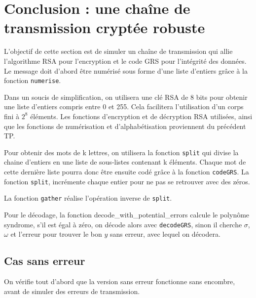 \documentclass[titlepage]{article}
\begin{document}
    \section{Conclusion : une chaîne de transmission cryptée robuste}
    L'objectif de cette section est de simuler un chaîne de transmission qui allie l'algorithme RSA pour l'encryption et le code GRS pour l'intégrité des données.
    Le message doit d'abord être numérisé sous forme d'une liste d'entiers grâce à la fonction \texttt{numerise}.
    
    Dans un soucis de simplification, on utilisera une clé RSA de 8 bits pour obtenir une liste d'entiers compris entre 0 et 255. Cela facilitera l'utilisation d'un corps fini à $2^8$ éléments.
    Les fonctions d'encryption et de décryption RSA utilisées, ainsi que les fonctions de numérisation et d'alphabétisation proviennent du précédent TP.
    
    Pour obtenir des mots de k lettres, on utilisera la fonction \texttt{split} qui divise la chaine d'entiers en une liste de sous-listes contenant k éléments. 
    Chaque mot de cette dernière liste pourra donc être ensuite codé grâce à la fonction \texttt{codeGRS}.
    La fonction \texttt{split}, incrémente chaque entier pour ne pas se retrouver avec des zéros.

    

    La fonction \texttt{gather} réalise l'opération inverse de \texttt{split}.

    

    Pour le décodage, la fonction decode\_with\_potential\_errors calcule le polynôme syndrome,
    s'il est égal à zéro, on décode alors avec \texttt{decodeGRS}, sinon il cherche $\sigma$, $\omega$ et l'erreur
    pour trouver le bon $y$ sans erreur, avec lequel on décodera.

    

        \subsection{Cas sans erreur}

        On vérifie tout d'abord que la version sans erreur fonctionne sans encombre, avant de simuler des erreurs de transmission.
        \bigbreak
\end{document}

